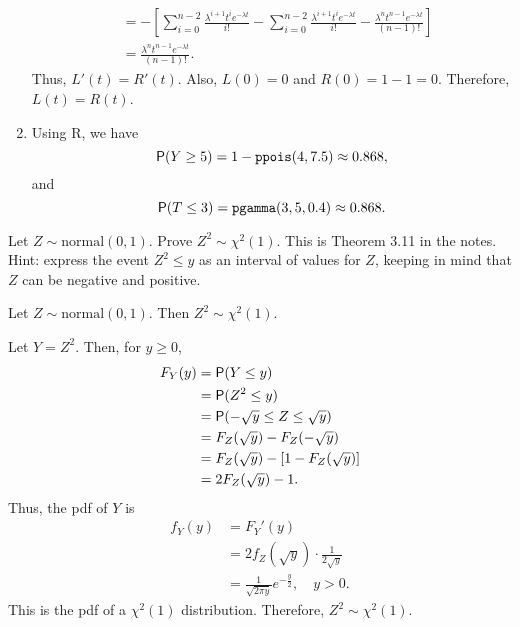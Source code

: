 \documentclass[12pt]{article}
\newcommand{\Prob}{{\sf P}}
\newenvironment{theorem}[2][Theorem]{\begin{trivlist}
\item[\hskip \labelsep {\bfseries #1}\hskip \labelsep {\bfseries #2.}]}
{\end{trivlist}}
\newenvironment{problem}[2][Problem]{\begin{trivlist}
\item[\hskip \labelsep {\bfseries #1}\hskip \labelsep {\bfseries #2.}]}
{\end{trivlist}}
\begin{document}
\begin{problem}{6}
\begin{enumerate}
\[\begin{aligned}
        &= -\left[ \sum_{i=0}^{n-2} \frac{\lambda^{i+1} t^i e^{-\lambda t}}{i!} 
        - \sum_{i=0}^{n-2} \frac{\lambda^{i+1} t^i e^{-\lambda t}}{i!} 
        - \frac{\lambda^n t^{n-1} e^{-\lambda t}}{(n-1)!} \right] \\
        &= \frac{\lambda^n t^{n-1} e^{-\lambda t}}{(n-1)!}.
      \end{aligned}
    \]
    Thus, $L'(t) = R'(t)$.
    Also, $L(0) = 0$ and $R(0) = 1 - 1 = 0$. Therefore, $L(t) = R(t)$.
    \item Using R, we have
    \[
      \Prob(Y \geq 5) = 1 - \texttt{ppois}(4, 7.5) \approx 0.868,
    \]
    and
    \[
      \Prob(T \leq 3) = \texttt{pgamma}(3, 5, 0.4) \approx 0.868.
    \]
  \end{enumerate}
\end{problem}

\begin{problem}{7}
  Let $Z \sim \text{normal}(0, 1)$. Prove $Z^2 \sim \chi^2(1)$. This is 
  Theorem 3.11 in the notes. Hint: express the event $Z^2 \leq y$ 
  as an interval of values for $Z$, keeping in mind that $Z$ can be
  negative and positive.
  \begin{theorem}{3.11}
    Let $Z \sim \text{normal}(0, 1)$. Then $Z^2 \sim \chi^2(1)$.
  \end{theorem}
  Let $Y = Z^2$. Then, for $y \geq 0$,
  \[
    \begin{aligned}
      F_Y(y) &= \Prob(Y \leq y) \\
      &= \Prob(Z^2 \leq y) \\
      &= \Prob(-\sqrt{y} \leq Z \leq \sqrt{y}) \\
      &= F_Z(\sqrt{y}) - F_Z(-\sqrt{y}) \\
      &= F_Z(\sqrt{y}) - [1 - F_Z(\sqrt{y})] \\
      &= 2F_Z(\sqrt{y}) - 1.
    \end{aligned}
  \]
  Thus, the pdf of $Y$ is
  \[
    \begin{aligned}
      f_Y(y) &= F_Y'(y) \\
      &= 2 f_Z(\sqrt{y}) \cdot \frac{1}{2\sqrt{y}} \\
      &= \frac{1}{\sqrt{2\pi y}} e^{-\frac{y}{2}}, \quad y > 0.
    \end{aligned}
  \]
  This is the pdf of a $\chi^2(1)$ distribution. Therefore, $Z^2 \sim \chi^2(1)$.
\end{problem}

\end{document}
